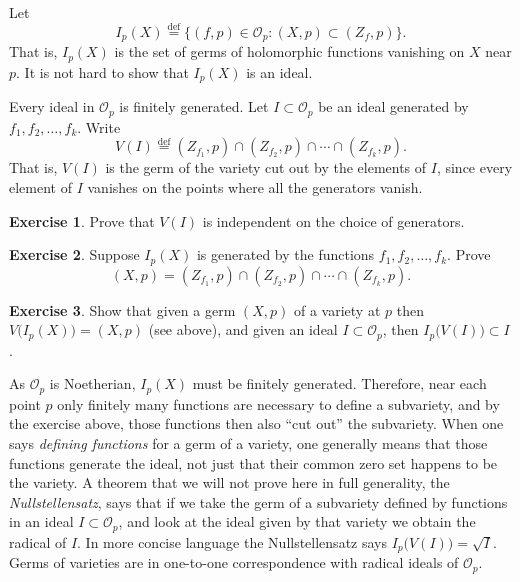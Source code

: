 \documentclass[12pt,openany]{book}
\newcommand{\sO}{{\mathscr{O}}}
\newcommand{\myindex}[1]{#1\index{#1}}
\theoremstyle{plain}
\theoremstyle{remark}
\theoremstyle{definition}
\newenvironment{exbox}{%
    \def\FrameCommand{\vrule width 1pt \relax\hspace {10pt}}%
    \MakeFramed {\advance \hsize -\width \FrameRestore }%
}{%
    \endMakeFramed
}
\theoremstyle{exercise}
\newtheorem{exercise}{Exercise}[section]
\theoremstyle{example}
\begin{document}
Let
\begin{equation*}
I_p(X) \overset{\text{def}}{=}
\bigl\{ (f,p) \in \sO_p : (X,p) \subset (Z_f,p) \bigr\} .
\end{equation*}
That is, $I_p(X)$ is the set of germs of holomorphic functions vanishing on
$X$ near $p$.  It is not hard to show that $I_p(X)$ is an ideal.

Every ideal in $\sO_p$ is finitely generated.
Let $I \subset \sO_p$ be an ideal generated by $f_1,f_2,\ldots,f_k$.
Write
\begin{equation*}
V(I) \overset{\text{def}}{=}
(Z_{f_1},p) \cap (Z_{f_2},p) \cap \cdots \cap (Z_{f_k},p) .
\end{equation*}
That is, $V(I)$ is the germ of the variety cut out by the elements of $I$,
since every
element of $I$ vanishes on the points where all the generators vanish.

\begin{exbox}
\begin{exercise}
Prove that $V(I)$ is independent on the choice of generators.
\end{exercise}

\begin{exercise}
Suppose $I_p(X)$ is generated by the functions $f_1, f_2, \ldots, f_k$.
Prove 
\begin{equation*}
(X,p) = (Z_{f_1},p) \cap (Z_{f_2},p) \cap \cdots \cap (Z_{f_k},p) .
\end{equation*}
\end{exercise}

\begin{exercise}
Show that given a germ $(X,p)$ of a variety at $p$ then
$V\bigl(I_p(X)\bigr) = (X,p)$ (see above), and
given an ideal $I \subset \sO_p$, then
$I_p\bigl(V(I)\bigr) \subset I$.
\end{exercise}
\end{exbox}

As $\sO_p$ is Noetherian, $I_p(X)$ must be finitely
generated.  Therefore, near each point $p$ only finitely many functions are
necessary to define a subvariety, and by the exercise above, those functions 
then also ``cut out'' the subvariety.  When one says 
\emph{\myindex{defining functions}} for a germ of a variety, one generally
means that those functions generate the ideal, not just that their common
zero set happens to be the variety.  A theorem that we will not prove here
in full generality,
the \emph{\myindex{Nullstellensatz}}, says that if we take the germ of
a subvariety defined by functions
in an ideal $I \subset \sO_p$, and look at the ideal given by that variety we obtain the
radical of $I$.  In more concise language the Nullstellensatz says
$I_p\bigl(V(I)\bigr) = \sqrt{I}$.
Germs of varieties are in
one-to-one correspondence with radical ideals of $\sO_p$.
\end{document}
